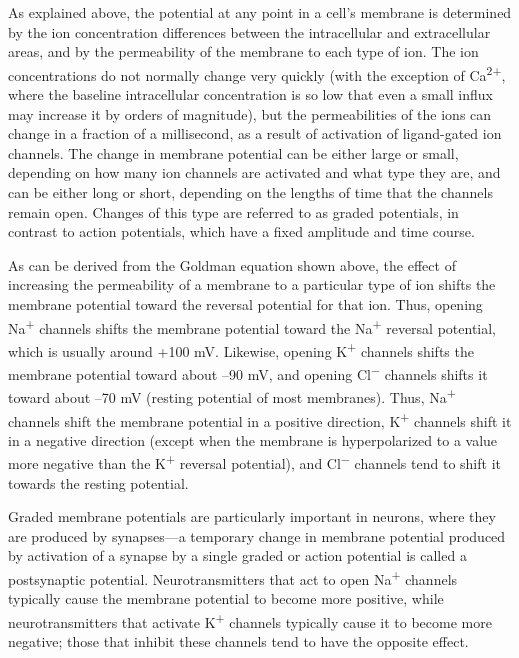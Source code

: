 \documentclass[]{book}
\begin{document}
As explained above, the potential at any point in a cell's membrane is determined by the ion concentration differences between the intracellular and extracellular areas, and by the permeability of the membrane to each type of ion. The ion concentrations do not normally change very quickly (with the exception of Ca\textsuperscript{2+}, where the baseline intracellular concentration is so low that even a small influx may increase it by orders of magnitude), but the permeabilities of the ions can change in a fraction of a millisecond, as a result of activation of ligand-gated ion channels. The change in membrane potential can be either large or small, depending on how many ion channels are activated and what type they are, and can be either long or short, depending on the lengths of time that the channels remain open. Changes of this type are referred to as graded potentials, in contrast to action potentials, which have a fixed amplitude and time course.

As can be derived from the Goldman equation shown above, the effect of increasing the permeability of a membrane to a particular type of ion shifts the membrane potential toward the reversal potential for that ion. Thus, opening Na\textsuperscript{+} channels shifts the membrane potential toward the Na\textsuperscript{+} reversal potential, which is usually around +100 mV. Likewise, opening K\textsuperscript{+} channels shifts the membrane potential toward about --90 mV, and opening Cl\textsuperscript{−} channels shifts it toward about --70 mV (resting potential of most membranes). Thus, Na\textsuperscript{+} channels shift the membrane potential in a positive direction, K\textsuperscript{+} channels shift it in a negative direction (except when the membrane is hyperpolarized to a value more negative than the K\textsuperscript{+} reversal potential), and Cl\textsuperscript{−} channels tend to shift it towards the resting potential.

Graded membrane potentials are particularly important in neurons, where they are produced by synapses---a temporary change in membrane potential produced by activation of a synapse by a single graded or action potential is called a postsynaptic potential. Neurotransmitters that act to open Na\textsuperscript{+} channels typically cause the membrane potential to become more positive, while neurotransmitters that activate K\textsuperscript{+} channels typically cause it to become more negative; those that inhibit these channels tend to have the opposite effect.
\end{document}
